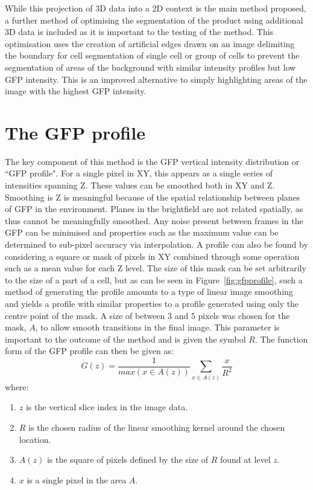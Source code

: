 While this projection of 3D data into a 2D context is the main method proposed, a further method of optimising the segmentation of the product using additional 3D data is included as it is important to the testing of the method. This optimisation uses the creation of artificial edges drawn on an image delimiting the boundary for cell segmentation of single cell or group of cells to prevent the segmentation of areas of the background with similar intensity profiles but low GFP intensity. This is an improved alternative to simply highlighting areas of the image with the highest GFP intensity.

\section{The GFP profile}

The key component of this method is the GFP vertical intensity distribution or ``GFP profile". For a single pixel in XY, this appears as a single series of intensities spanning Z. These values can be smoothed both in XY and Z. Smoothing is Z is meaningful because of the spatial relationship between planes of GFP in the environment. Planes in the brightfield are not related spatially, as thus cannot be meaningfully smoothed. Any noise present between frames in the GFP can be minimised and properties such as the maximum value can be determined to sub-pixel accuracy via interpolation. A profile can also be found by considering a square or mask of pixels in XY combined through some operation such as a mean value for each Z level. The size of this mask can be set arbitrarily to the size of a part of a cell, but as can be seen in Figure~\ref{fig:gfpprofile}, such a method of generating the profile amounts to a type of linear image smoothing and yields a profile with similar properties to a profile generated using only the centre point of the mask. A size of between 3 and 5 pixels was chosen for the mask, $A$, to allow smooth transitions in the final image. This parameter is important to the outcome of the method and is given the symbol $R$. The function form of the GFP profile can then be given as:
\begin{equation}
G(z) = \frac{1}{max(x \in A(z))}\sum_{x \in A(z)} \frac{x}{R^2}
\label{eq:gfpprofile}
\end{equation}
where:
\begin{enumerate}
	\item $z$ is the vertical slice index in the image data.
	\item $R$ is the chosen radius of the linear smoothing kernel around the chosen location.
	\item $A(z)$ is the square of pixels defined by the size of $R$ found at level $z$.
	\item $x$ is a single pixel in the area $A$.
\end{enumerate}

